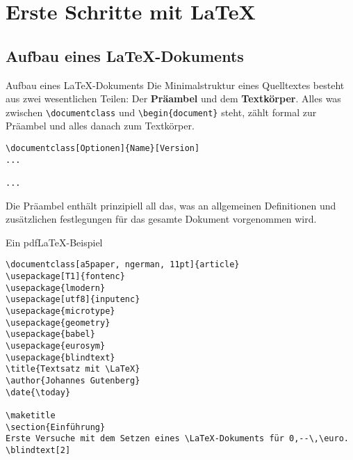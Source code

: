 \section{Erste Schritte mit \LaTeX}

\subsection{Aufbau eines \LaTeX{}-Dokuments}

\begin{frame}[fragile]{Aufbau eines \LaTeX{}-Dokuments}
	Die Minimalstruktur eines Quelltextes besteht aus zwei wesentlichen Teilen: Der \textbf{Präambel} und dem \textbf{Textkörper}. Alles was zwischen \texttt{\textbackslash documentclass} und \texttt{\textbackslash begin\{document\}} steht, zählt formal zur Präambel und alles danach zum Textkörper. 	
\begin{lstlisting}[style=tex]
\documentclass[Optionen]{Name}[Version] 
...

...

\end{lstlisting}
Die Präambel enthält prinzipiell all das, was an allgemeinen Definitionen und zusätzlichen festlegungen für das gesamte Dokument vorgenommen wird.	
\end{frame}

\begin{frame}[fragile]{Ein pdf\LaTeX{}-Beispiel}
\begin{lstlisting}[style=tex]
%% Ein pdflatex-Beispiel
\documentclass[a5paper, ngerman, 11pt]{article}
\usepackage[T1]{fontenc}
\usepackage{lmodern}
\usepackage[utf8]{inputenc}
\usepackage{microtype}
\usepackage{geometry}
\usepackage{babel}
\usepackage{eurosym}
\usepackage{blindtext}
\title{Textsatz mit \LaTeX}
\author{Johannes Gutenberg}
\date{\today}

\maketitle
\section{Einführung}
Erste Versuche mit dem Setzen eines \LaTeX-Dokuments für 0,--\,\euro.
\blindtext[2]

\end{lstlisting}
\end{frame}

